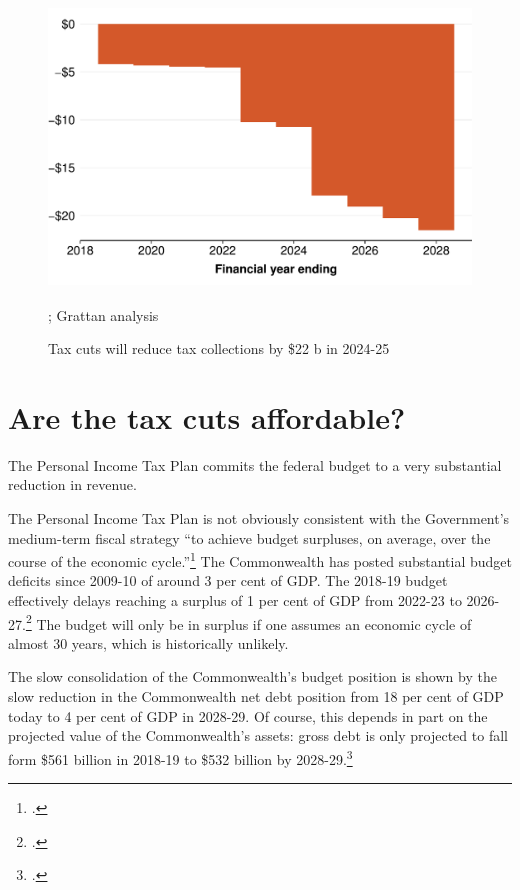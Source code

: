 \documentclass[submission]{grattan}\usepackage[]{graphicx}\usepackage[]{color}
\newenvironment{knitrout}{}{} %
\begin{document}
\begin{figure}
\caption{Tax cuts will reduce tax collections by \$22 b in 2024-25}\label{fig:1}
\begin{knitrout}
\color{fgcolor}
\includegraphics[width=4.47222in,height=2.92631723826715in]{atlas/fig1-1} 

\end{knitrout}


%
{\textcite{ATO2018}; Grattan analysis}
\end{figure}

\chapter{Are the tax cuts affordable? }\label{chap:are-the-tax-cuts-affordable}

The Personal Income Tax Plan commits the federal budget to a very substantial reduction in revenue.

The Personal Income Tax Plan is not obviously consistent with the Government's medium-term fiscal strategy ``to achieve budget surpluses, on average, over the course of the economic cycle.''\footcite[][3--7]{Treasury2018a}
The Commonwealth has posted substantial budget deficits since 2009-10 of around 3 per cent of GDP\@.
The 2018-19 budget effectively delays reaching a surplus of 1 per cent of GDP from 2022-23 to 2026-27.\footcite[][3--15]{Treasury2018a}
The budget will only be in surplus if one assumes an economic cycle of almost 30 years, which is historically unlikely.

The slow consolidation of the Commonwealth's budget position is shown by the slow reduction in the Commonwealth net debt position from 18 per cent of GDP today to 4 per cent of GDP in 2028-29. Of course, this depends in part on the projected value of the Commonwealth's assets: gross debt is only projected to fall form \$561 billion in 2018-19 to \$532 billion by 2028-29.\footcite[][3--16]{Treasury2018a}
\end{document}
